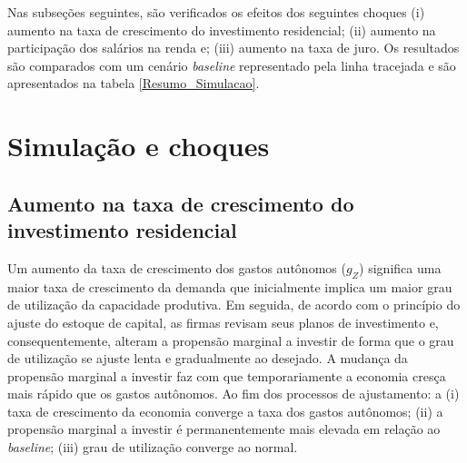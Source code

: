 Nas subseções seguintes, são verificados os efeitos dos seguintes choques
(i) aumento na taxa de crescimento do investimento residencial; (ii) aumento na participação dos salários na renda e; (iii) aumento na taxa de juro. Os resultados são comparados com um cenário \textit{baseline} representado pela linha tracejada e são apresentados na tabela \ref{Resumo_Simulacao}.

\section{Simulação e choques}
\label{SecChoques}

\subsection{Aumento na taxa de crescimento do investimento residencial}


Um aumento da taxa de crescimento dos gastos autônomos ($g_Z$) significa uma maior taxa de crescimento da demanda que inicialmente implica um maior grau de utilização da capacidade produtiva. Em seguida, de acordo com o princípio do ajuste do estoque de capital, as firmas revisam seus planos de investimento e, consequentemente, alteram a propensão marginal a investir de forma que o grau de utilização se ajuste lenta e gradualmente ao desejado. A mudança da propensão marginal a investir faz com que temporariamente a economia cresça mais rápido que os gastos autônomos. Ao fim dos processos de ajustamento: a (i) taxa de crescimento da economia converge a taxa dos gastos autônomos; (ii) a propensão marginal a investir é permanentemente mais elevada em relação ao \textit{baseline}; (iii) grau de utilização converge ao normal.




